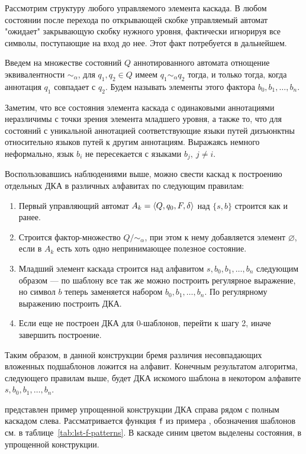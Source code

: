 Рассмотрим структуру любого управляемого элемента каскада. В любом состоянии после перехода по открывающей скобке 
управляемый автомат "ожидает" закрывающую скобку нужного уровня, фактически игнорируя все символы, поступающие на вход до нее. 
Этот факт потребуется в дальнейшем.
 
Введем на множестве состояний $Q$ аннотированного автомата отнощение эквивалентности $\sim_\alpha$, для $q_1, q_2 \in Q$ имеем $q_1 \sim_\alpha q_2$ тогда, и только тогда, когда аннотация $q_1$ совпадает с $q_2$. Будем называть элементы этого фактора $b_0, b_1, \dots, b_n$.

Заметим, что все состояния элемента каскада с одинаковыми аннотациями неразличимы с точки зрения элемента младшего уровня, а также то, что для состояний с уникальной аннотацией соответствующие языки путей дизъюнктны относительно языков путей к другим аннотациям. Выражаясь немного неформально, язык $b_i$ не пересекается с языками $b_j,\ j \neq i$. 

Воспользовавшись наблюдениями выше, можно свести каскад к построению отдельных ДКА в различных алфавитах по следующим правилам:
\begin{enumerate}
\item Первый управляющий автомат $A_k = \langle Q, q_0, F, \delta \rangle$ над $\{s, b\}$ строится как и ранее.
\item Строится фактор-множество $Q / \sim_\alpha$, при этом к нему добавляется элемент $\varnothing$, если в $A_k$
есть хоть одно непринимающее полезное состояние.
\item Младший элемент каскада строится над алфавитом $s, b_0, b_1, \dots, b_n$ следующим образом --- по шаблону 
все так же можно построить регулярное выражение, но символ $b$ теперь заменяется набором $b_0, b_1, \dots, b_n$. По регулярному выражению построить ДКА.
\item Если еще не построен ДКА для $0$-шаблонов, перейти к шагу 2, иначе завершить построение.
\end{enumerate}

Таким образом, в данной конструкции бремя различия несовпадающих вложенных подшаблонов ложится на алфавит. 
Конечным результатом алгоритма, следующего правилам выше, будет ДКА искомого шаблона в некотором алфавите $s, b_0, b_1, \dots, b_n.$

 представлен пример упрощенной конструкции ДКА справа рядом с полным каскадом слева. Рассматривается функция \texttt{f} из примера , обозначения шаблонов см. в таблице~\ref{tab:lst-f-patterns}. 
В каскаде синим цветом выделены состояния,  в упрощенной конструкции.

